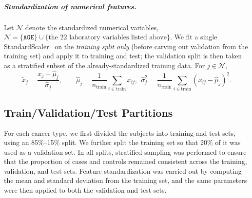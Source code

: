 \documentclass[journal,article,submit,pdftex,moreauthors]{Definitions/mdpi}
\begin{document}
\subparagraph{Standardization of numerical features.}
Let $\mathcal{N}$ denote the standardized numerical variables,
\(\mathcal{N}=\{\texttt{AGE}\}\cup\{\text{the 22 laboratory variables listed above}\}.\)
We fit a single StandardScaler~\citep{Pedregosa2011_sklearn} on the \emph{training split only} (before carving out validation from the training set) and apply it to training and test; the validation split is then taken as a stratified subset of the already-standardized training data. For $j\in\mathcal{N}$,
\begin{equation}
\tilde{x}_j=\frac{x_j-\hat{\mu}_j}{\hat{\sigma}_j},\qquad
\hat{\mu}_j=\frac{1}{n_{\text{train}}}\sum_{i\in \text{train}}x_{ij},\ \
\hat{\sigma}_j^2=\frac{1}{n_{\text{train}}}\sum_{i\in \text{train}}(x_{ij}-\hat{\mu}_j)^2.
\end{equation}




\subsection{Train/Validation/Test Partitions}
For each cancer type, we first divided the subjects into training and test sets, using an 85\%--15\% split. 
We further split the training set so that 20\% of it was used as a validation set. 
In all splits, stratified sampling was performed to ensure that the proportion of cases and controls remained consistent across the training, validation, and test sets. 
Feature standardization was carried out by computing the mean and standard deviation from the training set, and the same parameters were then applied to both the validation and test sets.
\end{document}

